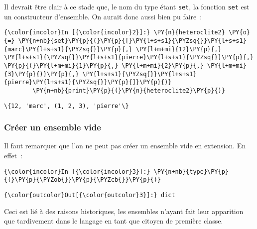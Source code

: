     Il devrait être clair à ce stade que, le nom du type étant \texttt{set},
la fonction \texttt{set} est un constructeur d'ensemble. On aurait donc
aussi bien pu faire~:

    \begin{Verbatim}[commandchars=\\\{\},frame=single,framerule=0.3mm,rulecolor=\color{cellframecolor}]
{\color{incolor}In [{\color{incolor}2}]:} \PY{n}{heteroclite2} \PY{o}{=} \PY{n+nb}{set}\PY{p}{(}\PY{p}{[}\PY{l+s+s1}{\PYZsq{}}\PY{l+s+s1}{marc}\PY{l+s+s1}{\PYZsq{}}\PY{p}{,} \PY{l+m+mi}{12}\PY{p}{,} \PY{l+s+s1}{\PYZsq{}}\PY{l+s+s1}{pierre}\PY{l+s+s1}{\PYZsq{}}\PY{p}{,} \PY{p}{(}\PY{l+m+mi}{1}\PY{p}{,} \PY{l+m+mi}{2}\PY{p}{,} \PY{l+m+mi}{3}\PY{p}{)}\PY{p}{,} \PY{l+s+s1}{\PYZsq{}}\PY{l+s+s1}{pierre}\PY{l+s+s1}{\PYZsq{}}\PY{p}{]}\PY{p}{)}
        \PY{n+nb}{print}\PY{p}{(}\PY{n}{heteroclite2}\PY{p}{)}
\end{Verbatim}


    \begin{Verbatim}[commandchars=\\\{\},frame=single,framerule=0.3mm,rulecolor=\color{cellframecolor}]
\{12, 'marc', (1, 2, 3), 'pierre'\}
\end{Verbatim}

    \hypertarget{cruxe9er-un-ensemble-vide}{%
\subsubsection{Créer un ensemble vide}\label{cruxe9er-un-ensemble-vide}}

    Il faut remarquer que l'on ne peut pas créer un ensemble vide en
extension. En effet~:

    \begin{Verbatim}[commandchars=\\\{\},frame=single,framerule=0.3mm,rulecolor=\color{cellframecolor}]
{\color{incolor}In [{\color{incolor}3}]:} \PY{n+nb}{type}\PY{p}{(}\PY{p}{\PYZob{}}\PY{p}{\PYZcb{}}\PY{p}{)}
\end{Verbatim}


\begin{Verbatim}[commandchars=\\\{\},frame=single,framerule=0.3mm,rulecolor=\color{cellframecolor}]
{\color{outcolor}Out[{\color{outcolor}3}]:} dict
\end{Verbatim}
            
    Ceci est lié à des raisons historiques, les ensembles n'ayant fait leur
apparition que tardivement dans le langage en tant que citoyen de
première classe.

